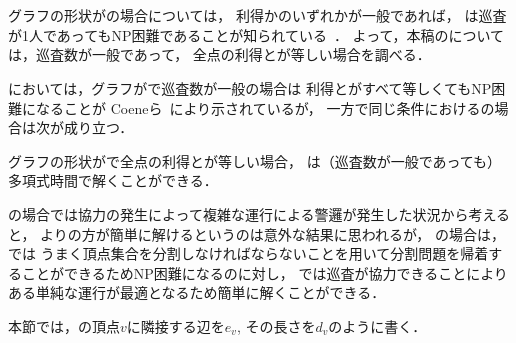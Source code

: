 \section{{\graphStar}}
\label{section: star}

グラフの形状が{\graphStar}の場合については，
利得か{\idletime}のいずれかが一般であれば，
{\patProb}は巡査が1人であってもNP困難であることが知られている~\cite{coene2011charlemagne}．
よって，本稿の{\patProb}については，巡査数が一般であって，
全点の利得と{\idletime}が等しい場合を調べる．

{\independentPatProb}においては，グラフが{\graphStar}で巡査数が一般の場合は
利得と{\idletime}がすべて等しくてもNP困難になることが
Coeneら~\cite{coene2011charlemagne}により示されているが，
一方で同じ条件における{\patProb}の場合は次が成り立つ．

\begin{theo}
\label{theo:StarEqualProfitTimelimit}
グラフの形状が{\graphStar}で全点の利得と{\idletime}が等しい場合，
{\patProb}は（巡査数が一般であっても）多項式時間で解くことができる．
\end{theo}

{\graphLine}の場合では協力の発生によって複雑な運行による警邏が発生した状況から考えると，
{\independentPatProb}より{\patProb}の方が簡単に解けるというのは意外な結果に思われるが，
{\graphStar}の場合は，{\independentPatProb}では
うまく頂点集合を分割しなければならないことを用いて分割問題を帰着することができるためNP困難になるのに対し，
{\patProb}では巡査が協力できることによりある単純な運行が最適となるため簡単に解くことができる．

本節では，{\graphStar}の頂点$v$に隣接する辺を$e_v$, その長さを$d_v$のように書く．

